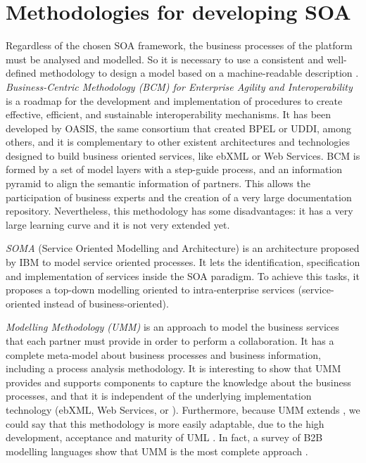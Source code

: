 \section{Methodologies for developing SOA}
Regardless of the chosen SOA framework, the business processes %
 of the platform must be analysed and modelled. So it is necessary to use a consistent and well-defined methodology to design a model based on a machine-readable description \cite{Garcia09UMM}. {\em Business-Centric Methodology (BCM) for Enterprise Agility and Interoperability} \cite{Oasis03BCM} is a roadmap for the development and implementation of procedures to create effective, efficient, and sustainable interoperability mechanisms. It has been developed by OASIS, the same consortium that created BPEL or UDDI, among others, and it is complementary to other existent architectures and technologies designed to build business oriented services, like ebXML or Web Services. BCM is formed by a set of model layers with a step-guide process, and an information pyramid to align the semantic information of partners. This allows the participation of business experts and the creation of a very large documentation repository. Nevertheless, this methodology has some disadvantages: it has a very large learning curve and it is not very extended yet. 

{\em SOMA} (Service Oriented Modelling and Architecture)
\cite{Arsanjani2008SOMA} is an architecture proposed by IBM to model
service oriented processes. It lets the identification, specification
and implementation of services inside the SOA paradigm. To achieve
this tasks, it proposes a top-down modelling oriented to
intra-enterprise services (service-oriented instead of
business-oriented). %

{\em {} Modelling Methodology (UMM)}
\cite{Hofreiter06UMM} is an approach to model the business services
that each partner must provide in order to perform a
 collaboration. It has a
complete meta-model about business processes and business information,
including a process analysis methodology. It is interesting to show
that UMM provides and supports components to capture the knowledge
about the business processes, and that it is independent of the
underlying implementation technology (ebXML, Web Services,
 or
). Furthermore, because
UMM extends , we could
say that this methodology is more easily adaptable, due to the high
development, acceptance and maturity of UML \cite{Garcia09UMM}. In
fact, a survey of B2B modelling languages show that UMM is the most
complete approach \cite{Folmer08b2b}. 

